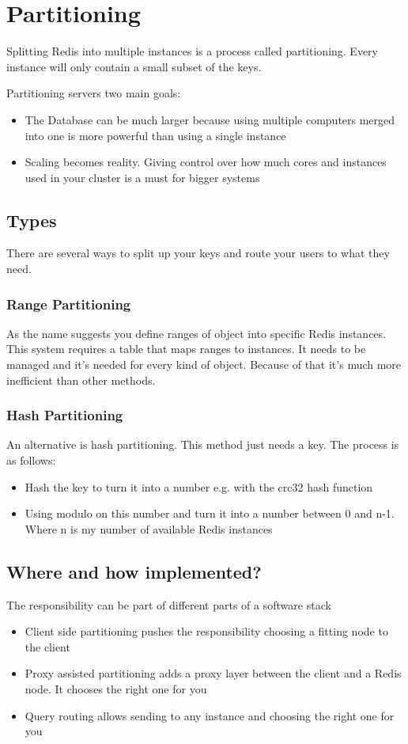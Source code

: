 \chapter{Partitioning}

Splitting Redis into multiple instances is a process called partitioning. Every instance will only contain a small subset of the keys.

Partitioning servers two main goals:
\begin{itemize}
	\item The Database can be much larger because using multiple computers merged into one is more powerful than using a single instance
	\item Scaling becomes reality. Giving control over how much cores and instances used in your cluster is a must for bigger systems
\end{itemize}

\section{Types}
There are several ways to split up your keys and route your users to what they need.

\subsection{Range Partitioning}
As the name suggests you define ranges of object into specific Redis instances. This system requires a table that maps ranges to instances. It needs to be managed and it's needed for every kind of object. Because of that it's much more inefficient than other methods.
\subsection{Hash Partitioning}
An alternative is hash partitioning. This method just needs a key. The process is as follows:
\begin{itemize}
	\item Hash the key to turn it into a number e.g. with the crc32 hash function
	\item Using modulo on this number and turn it into a number between 0 and n-1. Where n is my number of available Redis instances
\end{itemize}

\section{Where and how implemented?}
The responsibility can be part of different parts of a software stack
\begin{itemize}
	\item Client side partitioning pushes the responsibility choosing a fitting node to the client
	\item Proxy assisted partitioning adds a proxy layer between the client and a Redis node. It chooses the right one for you
	\item Query routing allows sending to any instance and choosing the right one for you
\end{itemize}

